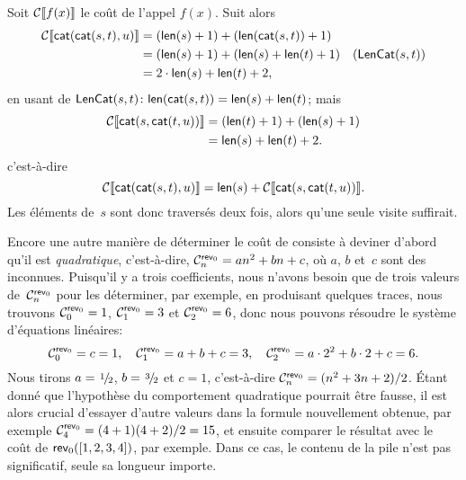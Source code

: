 Soit \(\Call{f(x)}\) le coût de l'appel \(f(x)\). Suit
alors
\begin{align*}
\Call{\fun{cat}(\fun{cat}(s,t),u)}
  &= (\fun{len}(s) + 1) + (\fun{len}(\fun{cat}(s,t)) + 1)\\
  &= (\fun{len}(s) + 1) + (\fun{len}(s) + \fun{len}(t) + 1) & (\pred{LenCat}{s,t})\\
  &= 2 \cdot \fun{len}(s) + \fun{len}(t) + 2,
\end{align*}
en usant de \(\pred{LenCat}{s,t} \colon \fun{len}(\fun{cat}(s,t)) =
\fun{len}(s) + \fun{len}(t)\); mais
\begin{align*}
  \Call{\fun{cat}(s,\fun{cat}(t,u))}
  &= (\fun{len}(t) + 1) + (\fun{len}(s) + 1)\\
  &= \fun{len}(s) + \fun{len}(t) + 2.
\end{align*}
c'est-à-dire
\begin{equation}
\Call{\fun{cat}(\fun{cat}(s,t),u)} = \fun{len}(s) +
\Call{\fun{cat}(s,\fun{cat}(t,u))}.
\label{ineq:cat_assoc}
\end{equation}
Les éléments de~\(s\) sont donc traversés deux fois, alors qu'une
seule visite suffirait.

Encore une autre manière de déterminer le coût de 
consiste à deviner d'abord qu'il est
\emph{quadratique}, c'est-à-dire,
\(\C{\fun{rev}_0}{n} = an^2 + bn +
c\), où \(a\), \(b\) et~\(c\) sont
des inconnues. Puisqu'il y a trois coefficients, nous n'avons besoin
que de trois valeurs de~\(\C{\fun{rev}_0}{n}\) pour les déterminer,
par exemple, en produisant quelques traces, nous trouvons
\(\C{\fun{rev}_0}{0} = 1\), \(\C{\fun{rev}_0}{1} = 3\) et
\(\C{\fun{rev}_0}{2} = 6\), donc nous pouvons résoudre le système
d'équations linéaires:
\begin{equation*}
\C{\fun{rev}_0}{0} = c = 1,\quad
\C{\fun{rev}_0}{1} = a + b + c = 3,\quad
\C{\fun{rev}_0}{2} = a \cdot 2^2 + b \cdot 2 + c = 6.
\end{equation*}
Nous tirons \(a = \myfrac1/2\), \(b = \myfrac3/2\) et \(c = 1\),
c'est-à-dire \(\C{\fun{rev}_0}{n} = (n^2 + 3n +
2)/2\). Étant donné que l'hypothèse
du comportement quadratique pourrait être fausse, il est alors crucial
d'essayer d'autre valeurs dans la formule nouvellement obtenue, par
exemple \(\C{\fun{rev}_0}{4} = (4+1)(4+2)/2 = 15\), et ensuite
comparer le résultat avec le coût de
\(\fun{rev}_0([1,2,3,4])\), par
exemple.  Dans ce cas, le contenu de la pile n'est pas significatif,
seule sa longueur importe.

